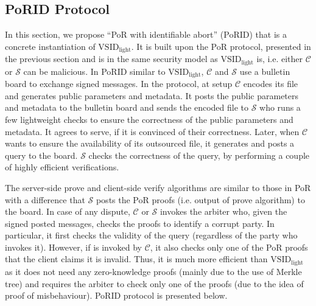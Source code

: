 

\subsection{PoRID Protocol}

In this section, we propose ``PoR with identifiable abort'' (PoRID) that is a concrete instantiation of $\text{VSID}_{\scriptscriptstyle\text{light}}$. It is built upon the PoR protocol, presented in the previous section and is in the same security model as $\text{VSID}_{\scriptscriptstyle\text{light}}$ is, i.e. either $\mathcal C$ or $\mathcal S$ can be malicious. In PoRID similar to $\text{VSID}_{\scriptscriptstyle\text{light}}$, $\mathcal C$ and $\mathcal S$ use a bulletin board to exchange signed messages.  In the protocol, at setup $\mathcal C$ encodes its file and generates public parameters and  metadata.  It posts the public parameters and metadata to the bulletin board and   sends the encoded file to $\mathcal S$ who runs a few lightweight checks to ensure the correctness of the public parameters and metadata. It agrees to serve, if it is convinced of their correctness. Later, when $\mathcal C$ wants to ensure the availability of its outsourced file, it  generates and posts a query  to the board.   $\mathcal S$  checks the correctness of the query, by performing a couple of highly efficient verifications. 

The server-side prove and client-side verify algorithms are similar to those in PoR with a difference that $\mathcal S$ posts the PoR proofs (i.e. output of prove algorithm) to the board. In  case of any dispute, $\mathcal C$ or $\mathcal S$ invokes the arbiter who, given the signed posted messages, checks the proofs  to identify a corrupt party. In particular,  it first checks the validity of the query (regardless of the party who invokes it). However, if  is invoked by  $\mathcal C$, it also checks  only one of the PoR proofs that the client claims it is invalid. Thus, it is much more efficient than $\text{VSID}_{\scriptscriptstyle\text{light}}$ as it does not need any zero-knowledge proofs (mainly due to the use of Merkle tree) and requires the  arbiter to check only one of the proofs (due  to the idea of proof of misbehaviour). PoRID protocol is presented below.






